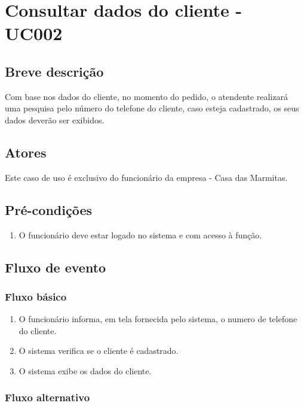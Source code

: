 \chapter{Consultar dados do cliente - UC002} \label{uc002}

\section{Breve descrição}

Com base nos dados do cliente, no momento do pedido, o atendente realizará uma pesquisa pelo número do telefone do cliente, caso esteja cadastrado, os seus dados deverão ser exibidos.

\section{Atores}

Este caso de uso é exclusivo do funcionário da empresa - Casa das Marmitas.

\section{Pré-condições}

\begin{enumerate}
	\item O funcionário deve estar logado no sistema e com acesso à função.
\end{enumerate}

\section{Fluxo de evento}

\subsection{Fluxo básico}

\begin{enumerate}
	\item O funcionário informa, em tela fornecida pelo sistema, o numero de telefone do cliente.	
	\item O sistema verifica se o cliente é cadastrado.
	\item O sistema exibe os dados do cliente.
\end{enumerate}

\subsection{Fluxo alternativo}

